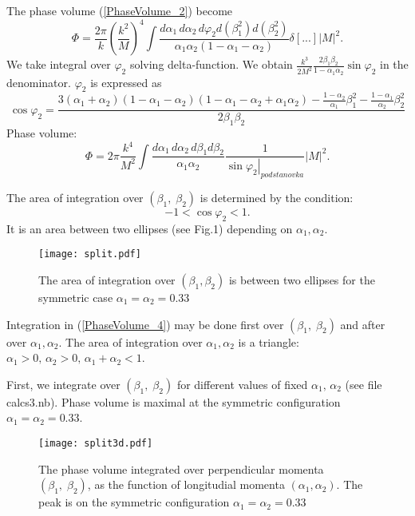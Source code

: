 \documentclass[12pt]{article}
\begin{document}
The phase volume (\ref{PhaseVolume_2}) become
\begin{equation}
\label{PhaseVolume_3}
\Phi = \frac{2\pi}{k}\left( \frac{k^2}{M}\right)^4 \int \frac{d\alpha_1\, d\alpha_2\, d\varphi_2 d(\beta_1^2) d(\beta_2^2)}{\alpha_1\alpha_2(1-\alpha_1-\alpha_2)} \delta\left[ ...\right] |M|^2.
\end{equation}
We take integral over $\varphi_2$ solving delta-function. We obtain $\frac{k^3}{2M^2}\frac{2\beta_1\beta_2}{1-\alpha_1\alpha_2}\sin\varphi_2$ in the denominator. $\varphi_2$ is expressed as
\begin{equation}
\label{cos_phi_2}
\cos \varphi_2=\frac{3(\alpha_1+\alpha_2)(1-\alpha_1-\alpha_2)(1-\alpha_1-\alpha_2 + \alpha_1\alpha_2) -\frac{1-\alpha_2}{\alpha_1}\beta_1^2 - \frac{1-\alpha_1}{\alpha_2}\beta_2^2  }{2\beta_1\beta_2}
\end{equation}
Phase volume:
\begin{equation}
\label{PhaseVolume_4}
\Phi = 2\pi\frac{k^4}{M^2} \int \frac{d\alpha_1\, d\alpha_2\, d\beta_1 d\beta_2}{\alpha_1\alpha_2} \frac{1}{\left. \sin\varphi_2 \right|_{podstanovka}} |M|^2.
\end{equation}

The area of integration over $(\beta_1,\; \beta_2)$ is determined by the condition: 
$$
-1<\cos\varphi_2 <1.
$$
It is an area between two ellipses (see Fig.1) depending on $\alpha_1,\alpha_2$.  
\begin{figure}
\centering
\texttt{[image: split.pdf]}
\caption{The area of integration over $(\beta_1,\beta_2)$ is between two ellipses for the symmetric case $\alpha_1=\alpha_2=0.33$}
\end{figure}

Integration in (\ref{PhaseVolume_4}) may be done first over $(\beta_1,\; \beta_2)$ and after over $\alpha_1,\alpha_2$. The area of integration over $\alpha_1,\alpha_2$ is a triangle: $\alpha_1>0,\,\alpha_2>0,\, \alpha_1+\alpha_2<1$. 

First, we integrate over $(\beta_1,\; \beta_2)$ for different values of fixed $\alpha_1,\,\alpha_2$ (see file calcs3.nb). Phase volume is maximal at  the symmetric configuration $\alpha_1=\alpha_2=0.33$.

\begin{figure}
\centering
\texttt{[image: split3d.pdf]}
\caption{The phase volume integrated over perpendicular momenta $(\beta_1,\; \beta_2)$, as the function of longitudial momenta $(\alpha_1,\alpha_2)$. The peak is on the symmetric configuration $\alpha_1=\alpha_2=0.33$ }
\end{figure}
\end{document}
